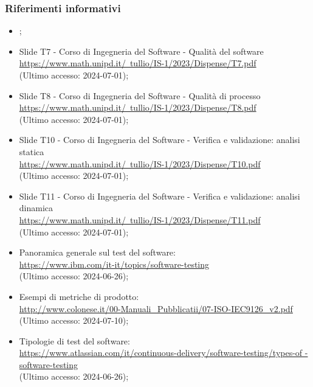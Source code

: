 \subsubsection{Riferimenti informativi}
\begin{itemize}
  \item \AnalisiDeiRequisiti;
  \item Slide T7 - Corso di Ingegneria del Software - Qualità del software \\ \href{https://www.math.unipd.it/~tullio/IS-1/2023/Dispense/T7.pdf}{https://www.math.unipd.it/~tullio/IS-1/2023/Dispense/T7.pdf}  \\ (Ultimo accesso: 2024-07-01);
  \item Slide T8 - Corso di Ingegneria del Software - Qualità di processo \\ \href{https://www.math.unipd.it/~tullio/IS-1/2023/Dispense/T8.pdf}{https://www.math.unipd.it/~tullio/IS-1/2023/Dispense/T8.pdf}  \\ (Ultimo accesso: 2024-07-01);
  \item Slide T10 - Corso di Ingegneria del Software - Verifica e validazione: analisi statica \\ \href{https://www.math.unipd.it/~tullio/IS-1/2023/Dispense/T10.pdf}{https://www.math.unipd.it/~tullio/IS-1/2023/Dispense/T10.pdf}  \\ (Ultimo accesso: 2024-07-01);
  \item Slide T11 - Corso di Ingegneria del Software - Verifica e validazione: analisi dinamica \\ \href{https://www.math.unipd.it/~tullio/IS-1/2023/Dispense/T11.pdf}{https://www.math.unipd.it/~tullio/IS-1/2023/Dispense/T11.pdf}  \\ (Ultimo accesso: 2024-07-01);
  \item Panoramica generale sul test del software: \\ \href{https://www.ibm.com/it-it/topics/software-testing}{https://www.ibm.com/it-it/topics/software-testing}  \\ (Ultimo accesso: 2024-06-26);
  \item Esempi di metriche di prodotto: \\ \href{http://www.colonese.it/00-Manuali_Pubblicatii/07-ISO-IEC9126_v2.pdf}{http://www.colonese.it/00-Manuali\_Pubblicatii/07-ISO-IEC9126\_v2.pdf} \\ (Ultimo accesso: 2024-07-10);
  \item Tipologie di test del software: \\ \href{https://www.atlassian.com/it/continuous-delivery/software-testing/types-of-software-testing}{https://www.atlassian.com/it/continuous-delivery/software-testing/types-of \- -software-testing}  \\ (Ultimo accesso: 2024-06-26);

\end{itemize}
